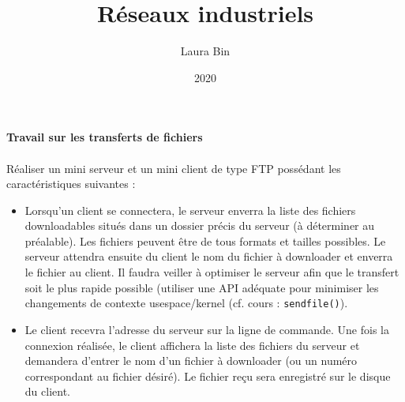 \documentclass{article}
\title{Réseaux industriels}
\date{2020}
\author{Laura Bin}
\begin{document}

    \begin{center}
        \textbf{\LARGE Travail sur les transferts de fichiers}
    \end{center}

    \paragraph{}
    Réaliser un mini serveur et un mini client de type FTP possédant les caractéristiques suivantes :
    \begin{itemize}
        \item Lorsqu’un client se connectera, le serveur enverra la liste des fichiers downloadables situés dans un dossier précis du serveur (à déterminer au préalable). Les fichiers peuvent être de tous formats et tailles possibles. Le serveur attendra ensuite du client le nom du fichier à downloader et enverra le fichier au client. Il faudra veiller à optimiser le serveur afin que le transfert soit le plus rapide possible (utiliser une API adéquate pour minimiser les changements de contexte usespace/kernel (cf. cours : \texttt{sendfile()}).
        \item Le client recevra l’adresse du serveur sur la ligne de commande. Une fois la connexion réalisée, le client affichera la liste des fichiers du serveur et demandera d’entrer le nom d’un fichier à downloader (ou un numéro correspondant au fichier désiré). Le fichier reçu sera enregistré sur le disque du client.
    \end{itemize}
\end{document}
